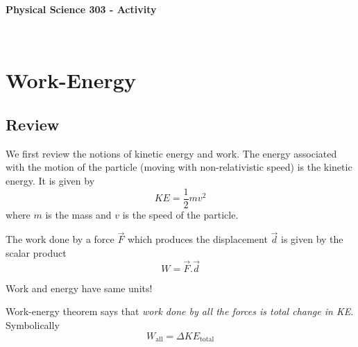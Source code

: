 \documentclass[10pt]{article}
\date{2014-6-22}
\begin{document}
\begin{center}
\begin{Large}\textbf{Physical Science 303 - Activity}\end{Large} \\
\smallskip
\end{center}

\section{Work-Energy}
\subsection{Review}
We first review the notions of kinetic energy and work.  The energy associated with the motion of the particle (moving with non-relativistic speed) is the kinetic energy.  It is given by
\begin{equation}
  KE = \frac{1}{2}mv^2
\end{equation}
where $m$ is the mass and $v$ is the speed of the particle.  

The work done by a force $\vec{F}$ which produces the displacement $\vec{d}$ is given by the scalar product
\begin{equation}
  W=\vec{F}.\vec{d}
\end{equation}

Work and energy have same units!  
 
Work-energy theorem says that \emph{work done by all the forces is total change in KE}.  Symbolically
\begin{equation}
  W_{\text{all}} = \Delta KE_{\text{total}}
\end{equation}
\end{document}
